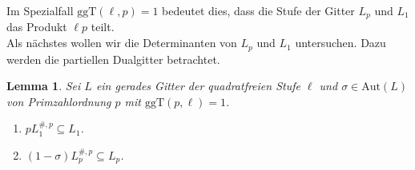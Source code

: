 \documentclass[12pt,a4paper,halfparskip,headsepline,bibtotocnumbered]{scrreprt}
\theoremstyle{nummermitklammern}
\newtheorem{lemma}[defsatzusw]{Lemma}
\theoremstyle{nonumberbreak}
\newcommand{\ggT}{\text{ggT}}
\newcommand{\Aut}{\text{Aut}}
\begin{document}
Im Spezialfall $\ggT(\ell, p) = 1$ bedeutet dies, dass die Stufe der Gitter $L_p$ und $L_1$ das Produkt $\ell p$ teilt.\\
Als nächstes wollen wir die Determinanten von $L_p$ und $L_1$ untersuchen. Dazu werden die partiellen Dualgitter betrachtet.

\begin{framed}
	\begin{lemma}\label{lem:fpinc}
		Sei $L$ ein gerades Gitter der quadratfreien Stufe $\ell$ und $\sigma \in \Aut(L)$ von Primzahlordnung $p$ mit $\ggT(p, \ell) = 1$.
		\begin{enumerate}[label=(\roman*)]
			\item $p L_1^{\#,p} \subseteq L_1$.
			\item $(1 - \sigma)L_p^{\#,p} \subseteq L_p$.
		\end{enumerate}
	\end{lemma}
\end{framed}
\end{document}
